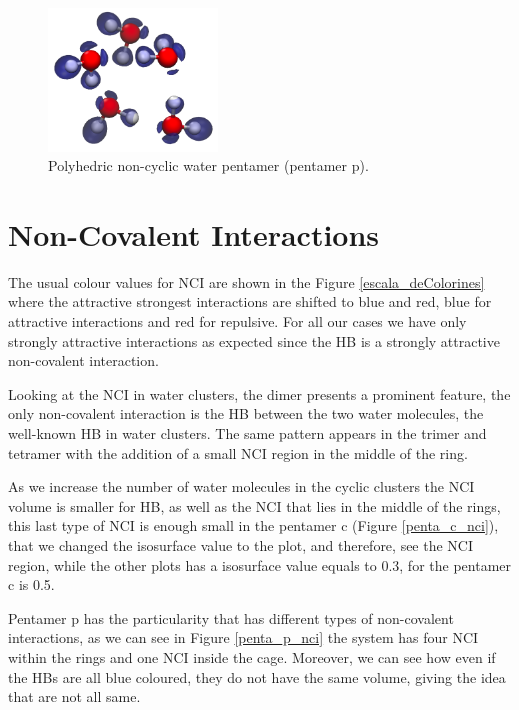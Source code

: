 \begin{figure}
\centering
\includegraphics[width=0.4\textwidth]{4/plots/elf/new/pentamer_pELF}
\caption{Polyhedric non-cyclic water pentamer (pentamer p).}
\label{pentamer_p}
\end{figure}

\newpage

\section{Non-Covalent Interactions}

The usual colour values for NCI are shown in the Figure \ref{escala_deColorines}
where the attractive strongest interactions are shifted to blue
and red, blue for attractive interactions and red for repulsive.
For all our cases we have only strongly attractive interactions as
expected since the HB is a strongly attractive 
non-covalent interaction.

Looking at the NCI in water clusters, the dimer presents a prominent feature,
the only non-covalent interaction is the HB between the two water molecules,
the well-known HB in water clusters. The same pattern appears in the trimer and
tetramer with the addition of a small NCI region in the middle of the ring.

As we increase the number of water molecules in the cyclic clusters the NCI
volume is smaller for HB, as well as the NCI that lies in the middle of the rings,
this last type of NCI is enough small in the pentamer c (Figure \ref{penta_c_nci}),
that we changed the isosurface value to the plot, and therefore, see the
NCI region, while the other plots has a isosurface value equals to 0.3,
for the pentamer c is 0.5.

Pentamer p has the particularity that has different types of non-covalent
interactions, as we can see in Figure \ref{penta_p_nci} the system has four NCI
within the rings and one NCI inside the cage. Moreover, we can see how even if
the HBs are all blue coloured, they do not have the same volume, giving the
idea that are not all same.

